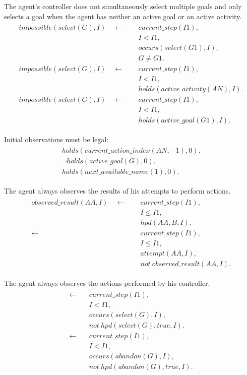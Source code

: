 \documentclass[11pt, oneside]{article}
\begin{document}
The agent's controller does not simultaneously select multiple goals and only selects a goal when the agent has neither an active goal or an active activity.
\begin{align}\begin{split}
impossible(select(G),I) \quad \leftarrow \quad\ &current\_step (I1),\\
&I<I1,\\
&occurs(select(G1), I),\\
&G\neq G1.\\
impossible(select(G),I)  \quad \leftarrow \quad\ &current\_step (I1),\\
&I<I1,\\
&holds(active\_activity(AN), I).\\
impossible(select(G),I)  \quad \leftarrow \quad\ &current\_step (I1),\\
&I<I1,\\
&holds(active\_goal(G1), I).
\end{split}\end{align}

Initial observations must be legal:
\begin{align}\begin{split}
holds(current\_action\_index(AN, -1), 0).\\
\neg holds(active\_goal(G), 0).\\
holds(next\_available\_name(1), 0).
\end{split}\end{align}

The agent always observes the results of his attempts to perform actions.
\begin{align}\begin{split}
observed\_result(AA,I) \quad \leftarrow \quad\ &current\_step (I1),\\
&I\leq I1,\\
&hpd(AA,B,I).\\
\leftarrow \quad\ &current\_step (I1),\\
&I\leq I1,\\
&attempt(AA,I),\\
&not\ observed\_result(AA,I).
\end{split}\end{align}

The agent always observes the actions performed by his controller. 
\begin{align}\begin{split}
\leftarrow \quad &current\_step(I1),\\
&I<I1,\\
&occurs(select(G),I),\\
&not\ hpd(select(G), true, I).\\
\leftarrow \quad &current\_step(I1),\\
&I<I1,\\
&occurs(abandon(G),I),\\
&not\ hpd(abandon(G), true, I).
\end{split}\end{align}
\end{document}

